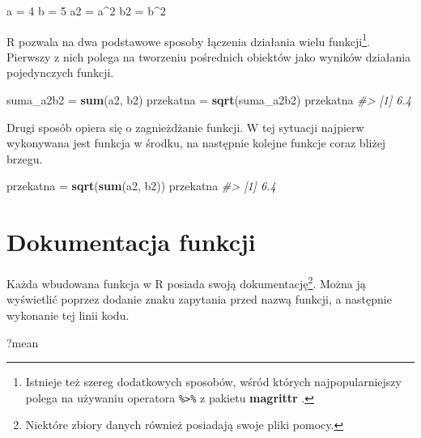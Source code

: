 \documentclass[paper=6in:9in,pagesize=pdftex,headinclude=on,footinclude=on,10pt]{scrbook}
\newenvironment{Shaded}{\begin{snugshade}}{\end{snugshade}}
\newcommand{\CommentTok}[1]{\textcolor[rgb]{0.56,0.35,0.01}{\textit{#1}}}
\newcommand{\DecValTok}[1]{\textcolor[rgb]{0.00,0.00,0.81}{#1}}
\newcommand{\KeywordTok}[1]{\textcolor[rgb]{0.13,0.29,0.53}{\textbf{#1}}}
\newcommand{\NormalTok}[1]{#1}
\newcommand{\OperatorTok}[1]{\textcolor[rgb]{0.81,0.36,0.00}{\textbf{#1}}}
\newcommand{\StringTok}[1]{\textcolor[rgb]{0.31,0.60,0.02}{#1}}
\begin{document}
\begin{Shaded}
\begin{Highlighting}[]
\NormalTok{a =}\StringTok{ }\DecValTok{4}
\NormalTok{b =}\StringTok{ }\DecValTok{5}
\NormalTok{a2 =}\StringTok{ }\NormalTok{a}\OperatorTok{^}\DecValTok{2}
\NormalTok{b2 =}\StringTok{ }\NormalTok{b}\OperatorTok{^}\DecValTok{2}
\end{Highlighting}
\end{Shaded}

R pozwala na dwa podstawowe sposoby łączenia działania wielu funkcji\footnote{Istnieje też szereg dodatkowych sposobów, wśród których najpopularniejszy polega na używaniu operatora \texttt{\%\textgreater{}\%} z pakietu \textbf{magrittr} \citep{R-magrittr}.}.
Pierwszy z nich polega na tworzeniu pośrednich obiektów jako wyników działania pojedynczych funkcji.

\begin{Shaded}
\begin{Highlighting}[]
\NormalTok{suma_a2b2 =}\StringTok{ }\KeywordTok{sum}\NormalTok{(a2, b2)}
\NormalTok{przekatna =}\StringTok{ }\KeywordTok{sqrt}\NormalTok{(suma_a2b2)}
\NormalTok{przekatna}
\CommentTok{#> [1] 6.4}
\end{Highlighting}
\end{Shaded}

Drugi sposób opiera się o zagnieżdżanie funkcji.
W tej sytuacji najpierw wykonywana jest funkcja w środku, na następnie kolejne funkcje coraz bliżej brzegu.

\begin{Shaded}
\begin{Highlighting}[]
\NormalTok{przekatna =}\StringTok{ }\KeywordTok{sqrt}\NormalTok{(}\KeywordTok{sum}\NormalTok{(a2, b2))}
\NormalTok{przekatna}
\CommentTok{#> [1] 6.4}
\end{Highlighting}
\end{Shaded}

\hypertarget{dokumentacja-funkcji}{%
\section{Dokumentacja funkcji}\label{dokumentacja-funkcji}}

Każda wbudowana funkcja w R posiada swoją dokumentację\footnote{Niektóre zbiory danych również posiadają swoje pliki pomocy.}.
Można ją wyświetlić poprzez dodanie znaku zapytania przed nazwą funkcji, a następnie wykonanie tej linii kodu.

\begin{Shaded}
\begin{Highlighting}[]
\NormalTok{?mean}
\end{Highlighting}
\end{Shaded}
\end{document}
